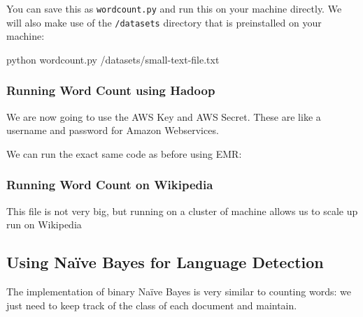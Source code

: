 You can save this as \texttt{wordcount.py} and run this on your machine
directly. We will also make use of the \texttt{/datasets} directory that is
preinstalled on your machine:

python wordcount.py /datasets/small-text-file.txt

\subsubsection{Running Word Count using Hadoop}

We are now going to use the AWS Key and AWS Secret. These are like a username
and password for Amazon Webservices.

We can run the exact same code as before using EMR:

\subsubsection{Running Word Count on Wikipedia}

This file is not very big, but running on a cluster of machine allows us to
scale up run on Wikipedia

\subsection{Using Naïve Bayes for Language Detection}

The implementation of binary Naïve Bayes is very similar to counting words: we just
need to keep track of the class of each document and maintain.


